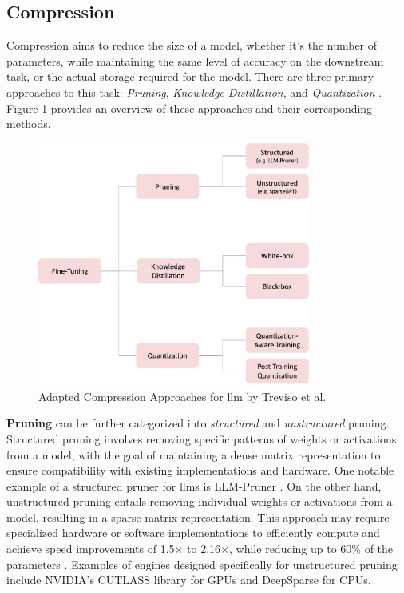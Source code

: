 \subsection{Compression}
\label{subsec:llm_compression}

Compression aims to reduce the size of a model, whether it's the number of parameters, while maintaining the same level of accuracy on the downstream task, or the actual storage required for the model. There are three primary approaches to this task: \textit{Pruning}, \textit{Knowledge Distillation}, and \textit{Quantization} \cite{treviso_efficient_2023, zhu_survey_2023}. Figure \ref{fig:llm_compression} provides an overview of these approaches and their corresponding methods.

\begin{figure}[h]
    \centering
    \includegraphics[width=0.8\textwidth]{Grafiken/compression_approaches.png}
    \caption{Adapted Compression Approaches for \gls{llm} by Treviso et al. \cite{treviso_efficient_2023}}
    \label{fig:llm_compression}
\end{figure}

\textbf{Pruning} can be further categorized into \textit{structured} and \textit{unstructured} pruning. Structured pruning involves removing specific patterns of weights or activations from a model, with the goal of maintaining a dense matrix representation to ensure compatibility with existing implementations and hardware. One notable example of a structured pruner for \gls{llm}s is LLM-Pruner \cite{ma_llm-pruner_2023}. On the other hand, unstructured pruning entails removing individual weights or activations from a model, resulting in a sparse matrix representation. This approach may require specialized hardware or software implementations to efficiently compute and achieve speed improvements of 1.5$\times$ to 2.16$\times$, while reducing up to 60\% of the parameters \cite{frantar_sparsegpt_2023}. Examples of engines designed specifically for unstructured pruning include NVIDIA's CUTLASS library for GPUs \cite{frantar_sparsegpt_2023} and DeepSparse \cite{noauthor_deepsparse_2023} for CPUs.

